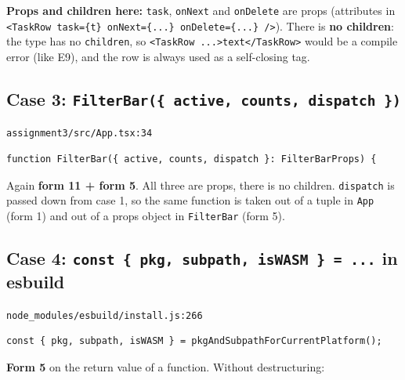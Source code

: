 \documentclass[
  10pt,
]{article}
\begin{document}
\textbf{Props and children here:} \texttt{task}, \texttt{onNext} and
\texttt{onDelete} are props (attributes in
\texttt{\textless{}\allowbreak{}TaskRow\ task=\{t\}\ onNext=\{.\allowbreak{}.\allowbreak{}.\allowbreak{}\}\ onDelete=\{.\allowbreak{}.\allowbreak{}.\allowbreak{}\}\ /\allowbreak{}\textgreater{}\allowbreak{}}).
There is \textbf{no children}: the type has no \texttt{children}, so
\texttt{\textless{}\allowbreak{}TaskRow\ .\allowbreak{}.\allowbreak{}.\allowbreak{}\textgreater{}\allowbreak{}text\textless{}\allowbreak{}/\allowbreak{}TaskRow\textgreater{}\allowbreak{}}
would be a compile error (like E9), and the row is always used as a
self-closing tag.

\hypertarget{case-3-filterbar-active-counts-dispatch-}{%
\subsection{\texorpdfstring{Case 3:
\texttt{FilterBar(\{\ active,\ counts,\ dispatch\ \})}}{Case 3: }}\label{case-3-filterbar-active-counts-dispatch-}}

\texttt{assignment3/\allowbreak{}src/\allowbreak{}App.\allowbreak{}tsx:34}

\begin{verbatim}
function FilterBar({ active, counts, dispatch }: FilterBarProps) {
\end{verbatim}

Again \textbf{form 11 + form 5}. All three are props, there is no
children. \texttt{dispatch} is passed down from case 1, so the same
function is taken out of a tuple in \texttt{App} (form 1) and out of a
props object in \texttt{FilterBar} (form 5).

\hypertarget{case-4-const--pkg-subpath-iswasm----in-esbuild}{%
\subsection{\texorpdfstring{Case 4:
\texttt{const\ \{\ pkg,\ subpath,\ isWASM\ \}\ =\ .\allowbreak{}.\allowbreak{}.\allowbreak{}}
in
esbuild}{Case 4:  in esbuild}}\label{case-4-const--pkg-subpath-iswasm----in-esbuild}}

\texttt{node\_modules/\allowbreak{}esbuild/\allowbreak{}install.\allowbreak{}js:266}

\begin{verbatim}
const { pkg, subpath, isWASM } = pkgAndSubpathForCurrentPlatform();
\end{verbatim}

\textbf{Form 5} on the return value of a function. Without
destructuring:
\end{document}
